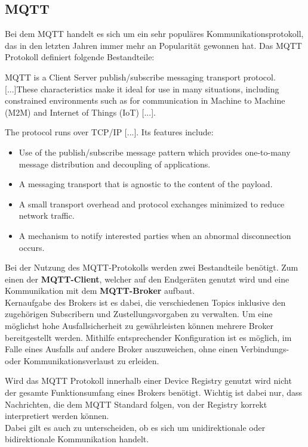 \subsection{MQTT}
Bei dem \ac{MQTT} handelt es sich um ein sehr populäres Kommunikationsprotokoll, das in den letzten Jahren immer mehr an Popularität gewonnen hat. Das \ac{MQTT} Protokoll definiert folgende Bestandteile:

\begin{definition}[MQTT]
    MQTT\autocite{standard2014mqtt} is a Client Server publish/subscribe messaging transport protocol. [...]These characteristics make it ideal for use in many situations, including constrained environments such as for communication in Machine to Machine (M2M) and Internet of Things (IoT) [...].

    The protocol runs over TCP/IP [...]. Its features include:

    \begin{itemize}
        \item Use of the publish/subscribe message pattern which provides one-to-many message distribution and decoupling of applications.
        \item A messaging transport that is agnostic to the content of the payload.
        \item A small transport overhead and protocol exchanges minimized to reduce network traffic.
        \item A mechanism to notify interested parties when an abnormal disconnection occurs.
    \end{itemize}
\end{definition}

Bei der Nutzung des MQTT-Protokolls werden zwei Bestandteile benötigt. Zum einen der \textbf{MQTT-Client}, welcher auf den Endgeräten genutzt wird und eine Kommunikation mit dem \textbf{MQTT-Broker} aufbaut.\\ Kernaufgabe des Brokers ist es dabei, die verschiedenen Topics inklusive den zugehörigen Subscribern und Zustellungsvorgaben zu verwalten. Um eine möglichst hohe Ausfallsicherheit zu gewährleisten können mehrere Broker bereitgestellt werden. Mithilfe entsprechender Konfiguration ist es möglich, im Falle eines Ausfalls auf andere Broker auszuweichen, ohne einen Verbindungs- oder Kommunikationsverlaust zu erleiden.

Wird das \ac{MQTT} Protokoll innerhalb einer Device Registry genutzt wird nicht der gesamte Funktionsumfang eines Brokers benötigt. Wichtig ist dabei nur, dass Nachrichten, die dem \ac{MQTT} Standard folgen, von der Registry korrekt interpretiert werden können.\\
Dabei gilt es auch zu unterscheiden, ob es sich um unidirektionale oder bidirektionale Kommunikation handelt. 

